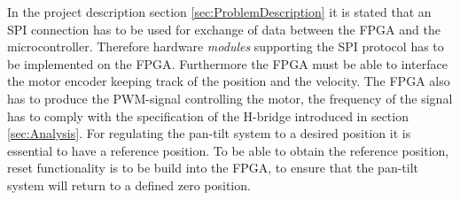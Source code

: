 \documentclass[../../main.tex]{subfiles}
\begin{document}
In the project description section \ref{sec:ProblemDescription} it is stated that an SPI connection has to be used for exchange of data between the FPGA and the microcontroller. Therefore hardware \textit{modules} supporting the SPI protocol has to be implemented on the FPGA. Furthermore the FPGA must be able to interface the motor encoder keeping track of the position and the velocity. The FPGA also has to produce the PWM-signal controlling the motor, the frequency of the signal has to comply with the specification of the H-bridge introduced in section \ref{sec:Analysis}. For regulating the pan-tilt system to a desired position it is essential to have a reference position. To be able to obtain the reference position, reset functionality is to be build into the FPGA, to ensure that the pan-tilt system will return to a defined zero position. 





\end{document}
